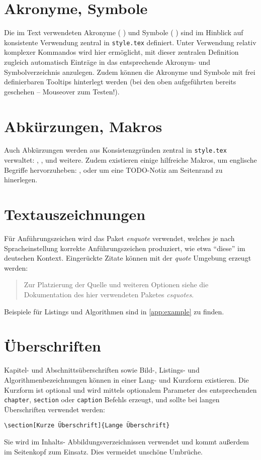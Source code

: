 \section{Akronyme, Symbole}\label{sec:symbole}
%
Die im Text verwendeten Akronyme (\zB{} \SCADA{}) und Symbole (\zB{} \sstoerung{}) sind im Hinblick auf konsistente Verwendung zentral in \texttt{style.tex} definiert. Unter Verwendung relativ komplexer Kommandos wird hier ermöglicht, mit dieser zentralen Definition zugleich automatisch Einträge in das entsprechende Akronym- und Symbolverzeichnis anzulegen. Zudem können die Akronyme und Symbole mit frei definierbaren Tooltips hinterlegt werden (bei den oben aufgeführten bereits geschehen -- Mouseover zum Testen!).
%
%
\section{Abkürzungen, Makros}\label{sec:makros}
%
Auch Abkürzungen werden aus Konsistenzgründen zentral in \texttt{style.tex} verwaltet: \zB{}, \sog{}, \bzgl{} und weitere. Zudem existieren einige hilfreiche Makros, \bspw{} um englische Begriffe hervorzuheben: , oder um eine TODO-Notiz am Seitenrand zu hinerlegen.
%
%
\section{Textauszeichnungen}\label{sec:textauszeichnungen}
%
Für Anführungszeichen wird das Paket \emph{enquote} verwendet, welches je nach Spracheinstellung korrekte Anführungszeichen produziert, wie etwa \enquote{diese} im deutschen Kontext. Eingerückte Zitate können mit der \emph{quote} Umgebung erzeugt werden:
%
\begin{quote}
  Zur Platzierung der Quelle und weiteren Optionen siehe die Dokumentation des hier verwendeten Paketes \emph{csquotes}.
\end{quote}
%
Beispiele für Listings und Algorithmen sind in \autoref{app:example} zu finden.
%
%
\section{Überschriften}\label{sec:ueberschriften}
%
Kapitel- und Abschnittsüberschriften sowie Bild-, Listings- und Algorithmenbezeichnungen können in einer Lang- und Kurzform existieren. Die Kurzform ist optional und wird mittels optionalem Parameter des entsprechenden \texttt{chapter}, \texttt{section} oder \texttt{caption} Befehls erzeugt, und sollte bei langen Überschriften verwendet werden:
%
\begin{center}
  \verb!\section[Kurze Überschrift]{Lange Überschrift}!
\end{center}
%
Sie wird im Inhalts- \bzw{} Abbildungsverzeichnissen \etc{} verwendet und kommt außerdem im Seitenkopf zum Einsatz. Dies vermeidet unschöne Umbrüche.
%
%
